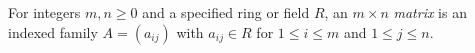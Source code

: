 
For integers $m,n\ge0$ and a specified ring or field $R$, an $m\times n$ \emph{matrix} is an indexed family $A=(a_{ij})$ with $a_{ij}\in R$ for $1\le i\le m$ and $1\le j\le n$.
